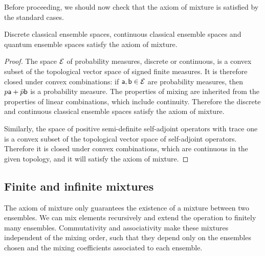 Before proceeding, we should now check that the axiom of mixture is satisfied by the standard cases.

\begin{mathSection}
\begin{prop}
	Discrete classical ensemble spaces, continuous classical ensemble spaces and quantum ensemble spaces satisfy the axiom of mixture.
\end{prop}

\begin{proof}
	The space $\Ens$ of probability measures, discrete or continuous, is a convex subset of the topological vector space of signed finite measures. It is therefore closed under convex combinations: if $\ens[a], \ens[b] \in \Ens$ are probability measures, then $p \ens[a] + \bar{p} \ens[b]$ is a probability measure. The properties of mixing are inherited from the properties of linear combinations, which include continuity. Therefore the discrete and continuous classical ensemble spaces satisfy the axiom of mixture.
	
	Similarly, the space of positive semi-definite self-adjoint operators with trace one is a convex subset of the topological vector space of self-adjoint operators. Therefore it is closed under convex combinations, which are continuous in the given topology, and it will satisfy the axiom of mixture.
\end{proof}
\end{mathSection}

\subsection{Finite and infinite mixtures}

The axiom of mixture only guarantees the existence of a mixture between two ensembles. We can mix elements recursively and extend the operation to finitely many ensembles. Commutativity and associativity make these mixtures independent of the mixing order, such that they depend only on the ensembles chosen and the mixing coefficients associated to each ensemble.

